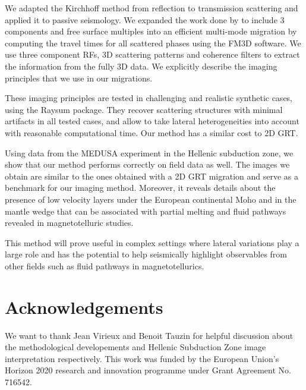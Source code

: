 \documentclass[9pt,a4paper]{article}
\numberwithin{equation}{section}
\begin{document}
\begin{multicols}{2}
We adapted the Kirchhoff method from reflection to transmission scattering and applied it to passive seismology.
We expanded the work done by \cite{cheng_gji_16} to include 3 components and free surface multiples into an efficient multi-mode migration by computing the travel times for all scattered phases using the FM3D software.
We use three component RFs, 3D scattering patterns and coherence filters to extract the information from the fully 3D data.
We explicitly describe the imaging principles that we use in our migrations.

These imaging principles are tested in challenging and realistic synthetic cases, using the Raysum package.
They recover scattering structures with minimal artifacts in all tested cases, and allow to take lateral heterogeneities into account with reasonable computational time.
Our method has a similar cost to 2D GRT.

Using data from the MEDUSA experiment in the Hellenic subduction zone, we show that our method performs correctly on field data as well.
The images we obtain are similar to the ones obtained with a 2D GRT migration and serve as a benchmark for our imaging method.
Moreover, it reveals details about the presence of low velocity layers under the European continental Moho and in the mantle wedge that can be associated with partial melting and fluid pathways revealed in magnetotelluric studies.

This method will prove useful in complex settings where lateral variations play a large role and has the potential to help seismically highlight observables from other fields such as fluid pathways in magnetotellurics.

\section*{Acknowledgements}

We want to thank Jean Virieux and Benoit Tauzin for helpful discussion about the methodological developements and Hellenic Subduction Zone image interpretation respectively.
This work was funded by the European Union’s Horizon 2020 research and innovation programme under Grant Agreement No. 716542.


%




\end{multicols}

%
\end{document}
